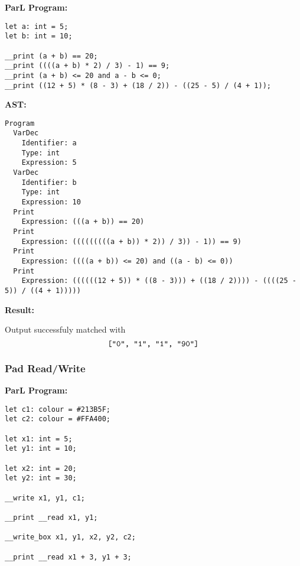 \textbf{ParL Program:}

{
    \lstset{xleftmargin=0.1\textwidth}

    \begin{lstlisting}
let a: int = 5;
let b: int = 10;

__print (a + b) == 20;
__print ((((a + b) * 2) / 3) - 1) == 9;
__print (a + b) <= 20 and a - b <= 0;
__print ((12 + 5) * (8 - 3) + (18 / 2)) - ((25 - 5) / (4 + 1));
\end{lstlisting}

}

\textbf{AST:}

{

    \lstset{xleftmargin=0\textwidth}

    \begin{lstlisting}
Program
  VarDec
    Identifier: a
    Type: int
    Expression: 5
  VarDec
    Identifier: b
    Type: int
    Expression: 10
  Print
    Expression: (((a + b)) == 20)
  Print
    Expression: (((((((((a + b)) * 2)) / 3)) - 1)) == 9)
  Print
    Expression: ((((a + b)) <= 20) and ((a - b) <= 0))
  Print
    Expression: ((((((12 + 5)) * ((8 - 3))) + ((18 / 2)))) - ((((25 - 5)) / ((4 + 1)))))
\end{lstlisting}

}

\textbf{Result:}

Output successfuly matched with $$\texttt{["0", "1", "1", "90"]}$$

\newpage

\subsubsection{Pad Read/Write}

\textbf{ParL Program:}

{
    \lstset{xleftmargin=0.2\textwidth}

    \begin{lstlisting}
let c1: colour = #213B5F;
let c2: colour = #FFA400;

let x1: int = 5;
let y1: int = 10;

let x2: int = 20;
let y2: int = 30;

__write x1, y1, c1;

__print __read x1, y1;

__write_box x1, y1, x2, y2, c2;

__print __read x1 + 3, y1 + 3;
\end{lstlisting}

}

